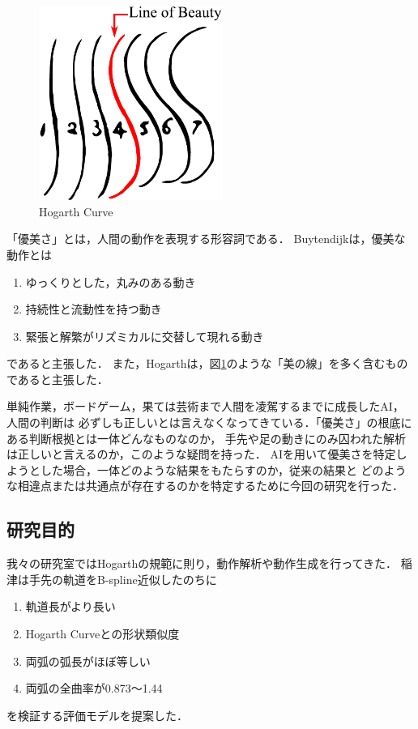 \begin{figure}[t]
  \begin{center}
    \includegraphics[width=60mm]{images/quote/hogarth_curve.pdf}
  \end{center}
  \caption{Hogarth Curve}
  \label{hogarth_curve}
\end{figure}

「優美さ」とは，人間の動作を表現する形容詞である．
Buytendijkは，優美な動作とは
\begin{enumerate}
  \item ゆっくりとした，丸みのある動き
  \item 持続性と流動性を持つ動き
  \item 緊張と解繁がリズミカルに交替して現れる動き
\end{enumerate}
であると主張した．
また，Hogarthは，図\ref{hogarth_curve}のような「美の線」を多く含むものであると主張した．

単純作業，ボードゲーム，果ては芸術まで人間を凌駕するまでに成長したAI，人間の判断は
必ずしも正しいとは言えなくなってきている．「優美さ」の根底にある判断根拠とは一体どんなものなのか，
手先や足の動きにのみ囚われた解析は正しいと言えるのか，このような疑問を持った．
AIを用いて優美さを特定しようとした場合，一体どのような結果をもたらすのか，従来の結果と
どのような相違点または共通点が存在するのかを特定するために今回の研究を行った．
\clearpage

\subsection{研究目的}
我々の研究室ではHogarthの規範に則り，動作解析や動作生成を行ってきた．
稲津\cite{inadu}は手先の軌道をB-spline近似\cite{bspline}したのちに
\begin{enumerate}
  \item 軌道長がより長い
  \item Hogarth Curveとの形状類似度
  \item 両弧の弧長がほぼ等しい
  \item 両弧の全曲率が0.873〜1.44
\end{enumerate}
を検証する評価モデルを提案した．

